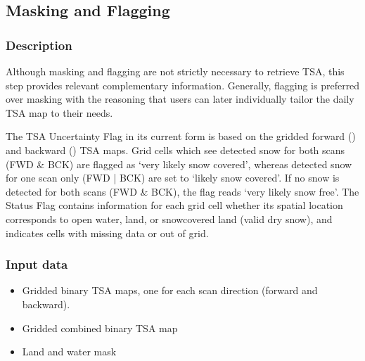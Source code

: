 \documentclass[letterpaper,10pt,english]{jupyterBook}
\begin{document}
\subsection{Masking and Flagging}
\label{\detokenize{book/baseline_algorithm_definition:masking-and-flagging}}

\subsubsection{Description}
\label{\detokenize{book/baseline_algorithm_definition:id9}}
\sphinxAtStartPar
Although masking and flagging are not strictly necessary to retrieve TSA, this step provides relevant complementary information.
Generally, flagging is preferred over masking with the reasoning that users can later individually tailor the daily TSA map to their needs.

\sphinxAtStartPar
The TSA Uncertainty Flag in its current form is based on the gridded forward ({\hyperref[\detokenize{book/acronyms:term-FWD}]{}}) and backward ({\hyperref[\detokenize{book/acronyms:term-BCK}]{}}) TSA maps.
Grid cells which see detected snow for both scans (FWD \& BCK) are flagged as ‘very likely snow covered’, whereas detected snow for one scan only (FWD | BCK) are set to ‘likely snow covered’.
If no snow is detected for both scans (FWD \& BCK), the flag reads ‘very likely snow free’.
The Status Flag contains information for each grid cell whether its spatial location corresponds to open water, land, or snow\sphinxhyphen{}covered land (valid dry snow), and indicates cells with missing data or out of grid.


\subsubsection{Input data}
\label{\detokenize{book/baseline_algorithm_definition:id10}}\begin{itemize}
\item {} 
\sphinxAtStartPar
Gridded binary TSA maps, one for each scan direction (forward and backward).

\item {} 
\sphinxAtStartPar
Gridded combined binary TSA map

\item {} 
\sphinxAtStartPar
Land and water mask

\end{itemize}
\end{document}
